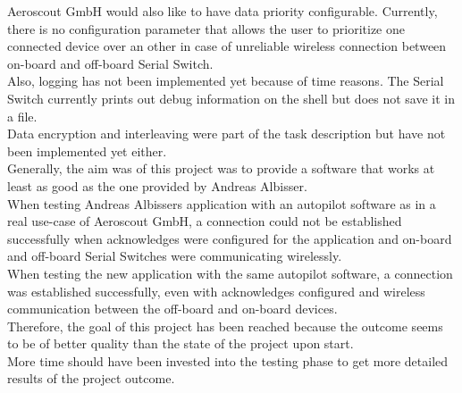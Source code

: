 Aeroscout GmbH would also like to have data priority configurable. Currently, there is no configuration parameter that allows the user to prioritize one connected device over an other in case of unreliable wireless connection between on-board and off-board Serial Switch.\\
Also, logging has not been implemented yet because of time reasons. The Serial Switch currently prints out debug information on the shell but does not save it in a file.\\
Data encryption and interleaving were part of the task description but have not been implemented yet either.\\
Generally, the aim was of this project was to provide a software that works at least as good as the one provided by Andreas Albisser.\\
When testing Andreas Albissers application with an autopilot software as in a real use-case of Aeroscout GmbH, a connection could not be established successfully when acknowledges were configured for the application and on-board and off-board Serial Switches were communicating wirelessly.\\
When testing the new application with the same autopilot software, a connection was established successfully, even with acknowledges configured and wireless communication between the off-board and on-board devices.\\
Therefore, the goal of this project has been reached because the outcome seems to be of better quality than the state of the project upon start.\\
More time should have been invested into the testing phase to get more detailed results of the project outcome.
%
%
%
%
%
%
%
%
%
